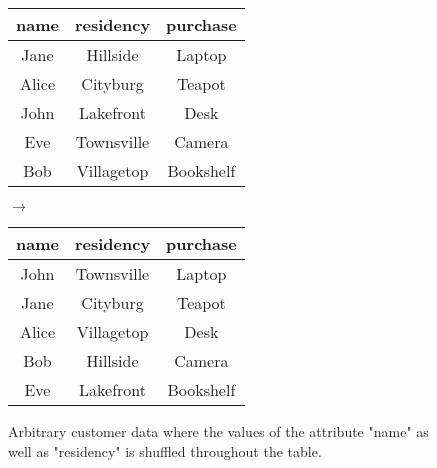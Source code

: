 \bigskip

\begin{figure}[ht]
    \begin{center}
    \footnotesize{
        \renewcommand{\arraystretch}{1.5}
        \begin{tabular}{|c|c|c|}
            \hline
            name & residency & purchase \\
            \hline
            Jane & Hillside & Laptop \\
            \hline
            Alice & Cityburg & Teapot \\
            \hline
            John & Lakefront & Desk \\
            \hline
            Eve & Townsville & Camera \\
            \hline
            Bob & Villagetop & Bookshelf \\
            \hline
        \end{tabular}
        \quad $\longrightarrow$ \quad
        \begin{tabular}{|c|c|c|}
            \hline
            name & residency & purchase \\
            \hline
            John & Townsville & Laptop \\
            \hline
            Jane & Cityburg & Teapot \\
            \hline
            Alice & Villagetop & Desk \\
            \hline
            Bob & Hillside & Camera \\
            \hline
            Eve & Lakefront & Bookshelf \\
            \hline
        \end{tabular}
    }
    \end{center}
    \caption{Arbitrary customer data where the values of the attribute "name" as well as "residency" is shuffled throughout the table. \label{fig:shuffling}}
\end{figure}

